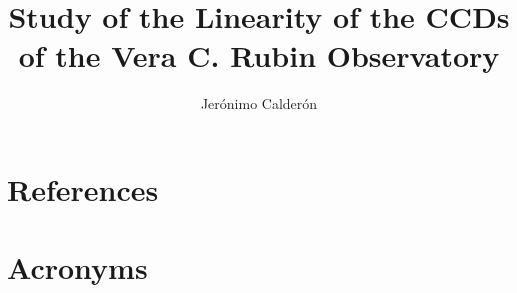 \documentclass[OPS,authoryear,toc]{lsstdoc}
\title{Study of the Linearity of the CCDs of the Vera C. Rubin Observatory}
\author{%
Jerónimo Calderón
}
\date{\vcsDate}
\begin{document}
\maketitle


\appendix
\section{References} \label{sec:bib}
\renewcommand{\refname}{} %


\section{Acronyms} \label{sec:acronyms}

\end{document}
